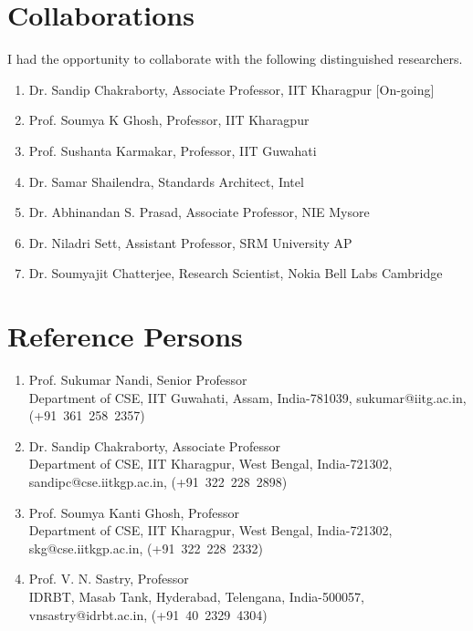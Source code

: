 \documentclass{article}
\begin{document}
\section{Collaborations}
I had the opportunity to collaborate with the following distinguished researchers.
  \begin{enumerate}
  	\item Dr. Sandip Chakraborty, Associate Professor, IIT Kharagpur [On-going]
	\item Prof. Soumya K Ghosh, Professor, IIT Kharagpur
	\item Prof. Sushanta Karmakar, Professor, IIT Guwahati
	\item Dr. Samar Shailendra, Standards Architect, Intel
	\item Dr. Abhinandan S. Prasad, Associate Professor, NIE Mysore
	\item Dr. Niladri Sett, Assistant Professor, SRM University AP
	\item Dr. Soumyajit Chatterjee, Research Scientist, Nokia Bell Labs Cambridge
  \end{enumerate}
\section{Reference Persons}
  \begin{enumerate}
  \item Prof. Sukumar Nandi, Senior Professor\\Department of CSE, IIT Guwahati, Assam, India-781039, sukumar@iitg.ac.in, (+91~361~258~2357)
  \item Dr. Sandip Chakraborty, Associate Professor\\Department of CSE, IIT Kharagpur, West Bengal, India-721302, sandipc@cse.iitkgp.ac.in, (+91~322~228~2898)
  \item Prof. Soumya Kanti Ghosh, Professor\\Department of CSE, IIT Kharagpur, West Bengal, India-721302, skg@cse.iitkgp.ac.in, (+91~322~228~2332)
  \item Prof. V. N. Sastry, Professor\\IDRBT, Masab Tank, Hyderabad, Telengana, India-500057, vnsastry@idrbt.ac.in, (+91~40~2329~4304) 
  \end{enumerate}
  
  
\end{document}
